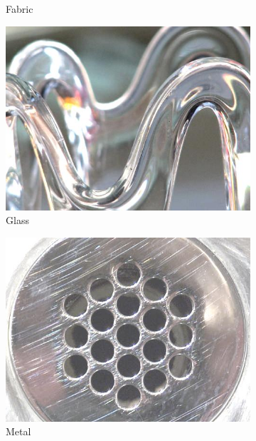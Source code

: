 \documentclass[12pt,a4paper]{article}
\begin{document}
\begin{figure}
\begin{subfigure}[c]{0.23\linewidth}
			\caption{Fabric}
			\vspace{2mm}
		\end{subfigure}
		\begin{subfigure}[c]{0.23\linewidth}
			\includegraphics[width=\linewidth]{./imgs/fmd2}
			\caption{Glass}
			\vspace{2mm}
		\end{subfigure}
		\begin{subfigure}[c]{0.23\linewidth}
			\includegraphics[width=\linewidth]{./imgs/fmd3}
			\caption{Metal}
			\vspace{2mm}
		\end{subfigure}
		\begin{subfigure}[c]{0.23\linewidth}

\end{subfigure}
\end{figure}
\end{document}
